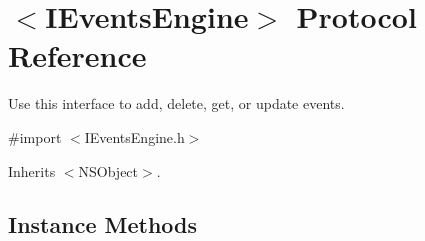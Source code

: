 \hypertarget{protocol_i_events_engine-p}{}\section{$<$I\+Events\+Engine$>$ Protocol Reference}
\label{protocol_i_events_engine-p}


Use this interface to add, delete, get, or update events.  




{\ttfamily \#import $<$I\+Events\+Engine.\+h$>$}



Inherits $<$\+N\+S\+Object$>$.

\subsection*{Instance Methods}
